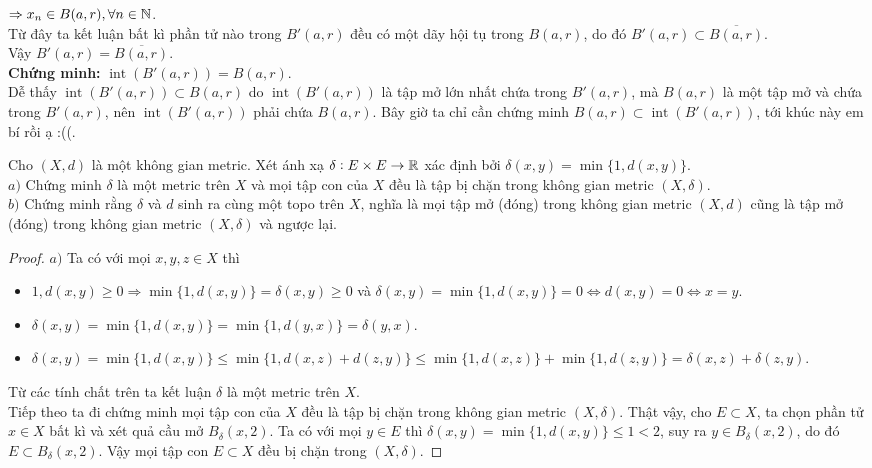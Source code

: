 $\Rightarrow x_n \in B(a,r), \forall n \in \mathbb N$.\\
Từ đây ta kết luận bất kì phần tử nào trong $B'(a,r)$ đều có một dãy hội tụ trong $B(a,r)$, do đó $B'(a,r) \subset \overline{B(a,r)}$.\\
Vậy $B'(a,r) = \overline{B(a,r)}$.\QEDFill\\[3mm]
\textbf{Chứng minh:} $\operatorname{int}(B'(a,r)) = B(a,r)$.\\
Dễ thấy $\operatorname{int}(B'(a,r)) \subset B(a,r)$ do $\operatorname{int}(B'(a,r))$ là tập mở lớn nhất chứa trong $B'(a,r)$, mà $B(a,r)$ là một tập mở và chứa trong $B'(a,r)$, nên $\operatorname{int}(B'(a,r))$ phải chứa $B(a,r)$. Bây giờ ta chỉ cần chứng minh $B(a,r) \subset \operatorname{int}(B'(a,r))$, tới khúc này em bí rồi ạ :((.

\begin{exercise}{6}
    Cho $(X,d)$ là một không gian metric. Xét ánh xạ $\delta:E \times E \rightarrow \mathbb R$ xác định bởi $\delta(x,y) = \min\{1,d(x,y)\}$.\\[3mm]
    $a)$ Chứng minh $\delta$ là một metric trên $X$ và mọi tập con của $X$ đều là tập bị chặn trong không gian metric $(X,\delta)$.\\[3mm]
    $b)$ Chứng minh rằng $\delta$ và $d$ sinh ra cùng một topo trên $X$, nghĩa là mọi tập mở (đóng) trong không gian metric $(X,d)$ cũng là tập mở (đóng) trong không gian metric $(X,\delta)$ và ngược lại.
\end{exercise}

\begin{proof}
$a)$ Ta có với mọi $x,y,z \in X$ thì
\begin{itemize}
    \item $1, d(x,y) \geq 0 \Rightarrow \min\{1, d(x,y)\} = \delta(x,y) \geq 0$ và $\delta(x,y) = \min\{1, d(x,y)\} = 0 \Leftrightarrow d(x,y) = 0 \Leftrightarrow x = y$.
    \item $\delta(x,y) = \min\{1, d(x,y)\} = \min\{1, d(y,x)\} = \delta(y,x)$.
    \item $\delta(x,y) = \min\{1, d(x,y)\} \leq \min\{1, d(x,z) + d(z,y)\} \leq \min\{1, d(x,z)\} + \min\{1, d(z,y)\} = \delta(x,z) + \delta(z,y)$.
\end{itemize}
Từ các tính chất trên ta kết luận $\delta$ là một metric trên $X$. \QEDFill\\[3mm]
Tiếp theo ta đi chứng minh mọi tập con của $X$ đều là tập bị chặn trong không gian metric $(X,\delta)$. Thật vậy, cho $E \subset X$, ta chọn phần tử $x \in X$ bất kì và xét quả cầu mở $B_{\delta}(x,2)$. Ta có với mọi $y \in E$ thì $\delta(x,y) = \min\{1, d(x,y)\} \leq 1 < 2$, suy ra $y \in B_{\delta}(x,2)$, do đó $E \subset B_{\delta}(x,2)$. Vậy mọi tập con $E \subset X$ đều bị chặn trong $(X,\delta)$.
\end{proof}

